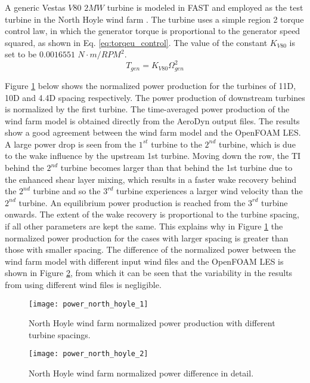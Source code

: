 \documentclass{umthesis}
\begin{document}
A generic Vestas $V80$ $2MW$ turbine is modeled in FAST and employed as the test turbine in the North Hoyle wind farm \cite{Churchfield_turbine}. The turbine uses a simple region 2 torque control law, in which the generator torque is proportional to the generator speed squared, as shown in Eq. \ref{eq:torqeu_control}. The value of the constant $K_{V80}$ is set to be $0.0016551$ $N\cdot m/RPM^2$.
\begin{equation}\label{eq:torqeu_control}
  T_{gen}=K_{V80}\Omega _{gen}^2
\end{equation}

Figure \ref{fig:power_north_hoyle_1} below shows the normalized power production for the turbines of 11D, 10D and 4.4D spacing respectively. The power production of downstream turbines is normalized by the first turbine. The time-averaged power production of the wind farm model is obtained directly from the AeroDyn output files. The results show a good agreement between the wind farm model and the OpenFOAM LES. A large power drop is seen from the $1^{st}$ turbine to the $2^{nd}$ turbine, which is due to the wake influence by the upstream 1st turbine. Moving down the row, the TI behind the $2^{nd}$ turbine becomes larger than that behind the 1st turbine due to the enhanced shear layer mixing, which results in a faster wake recovery behind the $2^{nd}$ turbine and so the $3^{rd}$ turbine experiences a larger wind velocity than the $2^{nd}$ turbine. An equilibrium power production is reached from the $3^{rd}$ turbine onwards. The extent of the wake recovery is proportional to the turbine spacing, if all other parameters are kept the same. This explains why in Figure \ref{fig:power_north_hoyle_1} the normalized power production for the cases with larger spacing is greater than those with smaller spacing. The difference of the normalized power between the wind farm model with different input wind files and the OpenFOAM LES is shown in Figure \ref{fig:power_north_hoyle_2}, from which it can be seen that the variability in the results from using different wind files is negligible.
\begin{figure}
  \centering
  \texttt{[image: power\_north\_hoyle\_1]}
  \caption{North Hoyle wind farm normalized power production with different turbine spacings.}\label{fig:power_north_hoyle_1}
\end{figure}

\begin{figure}
  \centering
  \texttt{[image: power\_north\_hoyle\_2]}
  \caption{North Hoyle wind farm normalized power difference in detail.}\label{fig:power_north_hoyle_2}
\end{figure}
\end{document}
